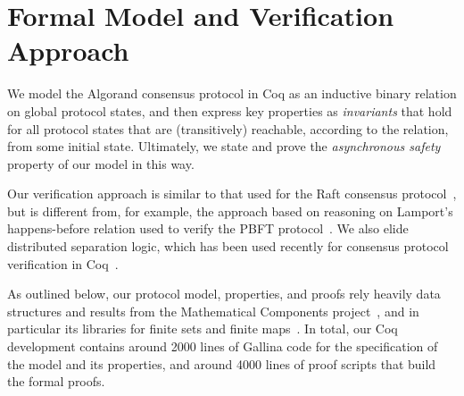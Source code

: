 \section{Formal Model and Verification Approach}
\label{sec:approach}

We model the Algorand consensus protocol in Coq as an inductive binary relation on global protocol states, and then express key properties as \emph{invariants} that hold for all protocol states that are (transitively) reachable, according to the relation, from some initial state. Ultimately, we state and prove the \emph{asynchronous safety} property of our model in this way.

Our verification approach is similar to that used for the Raft consensus protocol~\cite{Woos2016}, but is different from, for example, the approach based on reasoning on Lamport's happens-before relation used to verify the PBFT protocol~\cite{Rahli2018}. We also elide distributed separation logic, which has been used recently for consensus protocol verification in Coq~\cite{Sergey2018}.

As outlined below, our protocol model, properties, and proofs rely heavily data structures and results from the Mathematical Components project~\cite{MathComp}, and in particular its libraries for finite sets and finite maps~\cite{Cohen2019}. In total, our Coq development contains around 2000 lines of Gallina code for the specification of the model and its properties, and around 4000 lines of proof scripts that build the formal proofs.

